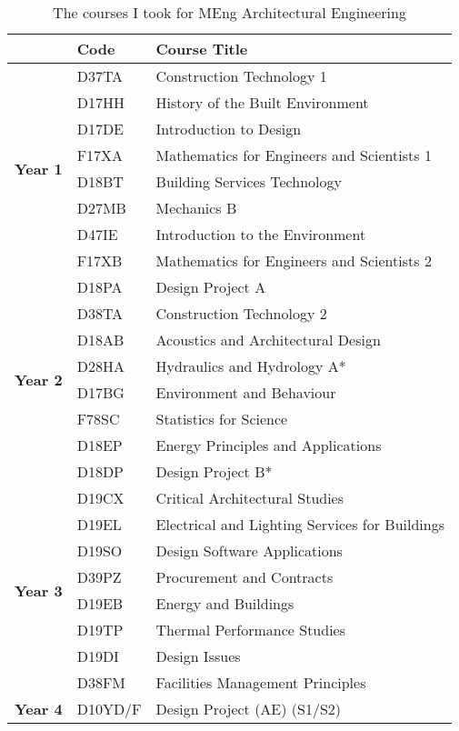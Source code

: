 \begin{table}[htbp]
	\caption{The courses I took for MEng Architectural Engineering}
	\label{tbl:courses}
	\centering
	\begin{tabular}{@{}lll@{}}
		\toprule
		\textbf{} & \textbf{Code} & \textbf{Course Title} \\ \midrule
		\multirow{8}{*}{\textbf{Year 1}} & D37TA & Construction Technology 1 \\
		& D17HH & History of the Built Environment \\
		& D17DE & Introduction to Design \\
		& F17XA & Mathematics for Engineers and Scientists 1 \\
		& D18BT & Building Services Technology \\
		& D27MB & Mechanics B \\
		& D47IE & Introduction to the Environment \\
		& F17XB & Mathematics for Engineers and Scientists 2 \\ \midrule
		\multirow{8}{*}{\textbf{Year 2}} & D18PA & Design Project A \\
		& D38TA & Construction Technology 2 \\
		& D18AB & Acoustics and Architectural Design \\
		& D28HA & Hydraulics and Hydrology A* \\
		& D17BG & Environment and Behaviour \\
		& F78SC & Statistics for Science \\
		& D18EP & Energy Principles and Applications \\
		& D18DP & Design Project B* \\ \midrule
		\multirow{8}{*}{\textbf{Year 3}} & D19CX & Critical Architectural Studies \\
		& D19EL & Electrical and Lighting Services for Buildings \\
		& D19SO & Design Software Applications \\
		& D39PZ & Procurement and Contracts \\
		& D19EB & Energy and Buildings \\
		& D19TP & Thermal Performance Studies \\
		& D19DI & Design Issues \\
		& D38FM & Facilities Management Principles \\ \midrule
		\multirow{6}{*}{\textbf{Year 4}} & D10YD/F & Design Project (AE) (S1/S2) \\

\end{tabular}
\end{table}
